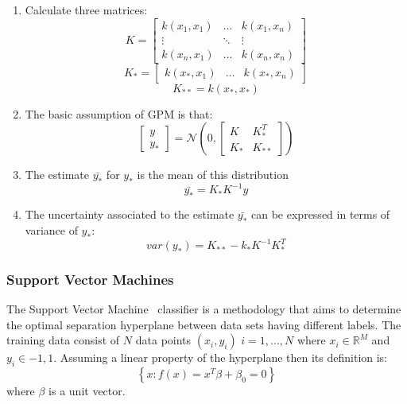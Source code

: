 \begin{enumerate}
\item Calculate three matrices:
\begin{equation}
K=\begin{bmatrix}
k(x_1,x_1) &  \ldots & k(x_1,x_n)\\ 
\vdots  & \ddots &\vdots  \\ 
k(x_n,x_1) &  \ldots & k(x_n,x_n)
\end{bmatrix}
\end{equation}
\begin{equation}
K_*= \begin{bmatrix}
k(x_*,x_1) & \ldots & k(x_*,x_n)
\end{bmatrix}
\end{equation}
\begin{equation}
K_{**}=k(x_*,x_*)
\end{equation}
\item The basic assumption of GPM is that:
\begin{equation}
\begin{bmatrix}
y\\
y_* 
\end{bmatrix}
=\mathcal{N}(0,\begin{bmatrix}
K & K_{*}^{T}\\ 
K_* & K_{**}
\end{bmatrix})
\end{equation}
\item The estimate $\bar{y_*} $ for $y_*$ is the mean of this distribution
\begin{equation}
\bar{y_*}=K_* K^{-1}y
\end{equation}
\item The uncertainty associated to the estimate $\bar{y_*} $ can be expressed in terms of variance of  $y_*$:
\begin{equation}
var(y_*)=K_{**}-k_* K^{-1} K_{*}^{T}
\end{equation}
\end{enumerate}

\subsubsection{Support Vector Machines}
\label{sec:SVM}
The Support Vector Machine~\cite{SVM_Burges} classifier is a methodology that aims to determine the optimal separation hyperplane between data sets having different labels.
The training data consist of $N$ data points $(x_i,y_i)$ $i=1,\ldots,N$ where $x_i \in \mathbb{R}^M$ and $y_i \in {-1,1}$.
Assuming a linear property of the hyperplane  then its definition is:
\begin{equation}
\left \{ x: f(x)=x^T\beta+\beta_0=0 \right \}
\end{equation}
where $\beta$ is a unit vector. 

